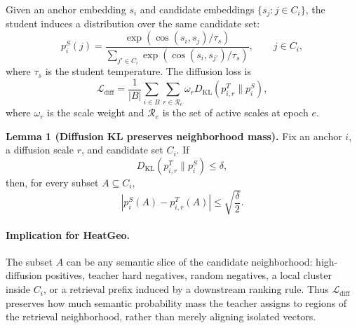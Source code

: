 Given an anchor embedding $s_i$ and candidate embeddings $\{s_j:j\in C_i\}$, the student induces a distribution over the same candidate set:
\begin{equation}
    p_i^{S}(j)
    =
    \frac{\exp(\cos(s_i,s_j)/\tau_s)}
    {\sum_{j'\in C_i}\exp(\cos(s_i,s_{j'})/\tau_s)},
    \qquad j\in C_i,
\end{equation}
where $\tau_s$ is the student temperature. The diffusion loss is
\begin{equation}
    \mathcal{L}_{\mathrm{diff}}
    =
    \frac{1}{|B|}
    \sum_{i\in B}
    \sum_{r\in\mathcal{R}_{e}}
    \omega_r
    D_{\mathrm{KL}}
    \left(
        p_{i,r}^{T} \| p_i^{S}
    \right),
\end{equation}
where $\omega_r$ is the scale weight and $\mathcal{R}_{e}$ is the set of active scales at epoch $e$.

\smallskip
\noindent\textbf{Lemma 1 (Diffusion KL preserves neighborhood mass).}
Fix an anchor $i$, a diffusion scale $r$, and candidate set $C_i$. If
\begin{equation}
    D_{\mathrm{KL}}\left(p^T_{i,r}\|p_i^S\right)\le \delta,
\end{equation}
then, for every subset $A\subseteq C_i$,
\begin{equation}
    \left|p_i^S(A)-p^T_{i,r}(A)\right|
    \le
    \sqrt{\frac{\delta}{2}}.
\end{equation}

\paragraph{Implication for HeatGeo.}
The subset $A$ can be any semantic slice of the candidate neighborhood: high-diffusion positives, teacher hard negatives, random negatives, a local cluster inside $C_i$, or a retrieval prefix induced by a downstream ranking rule. Thus $\mathcal{L}_{\mathrm{diff}}$ preserves how much semantic probability mass the teacher assigns to regions of the retrieval neighborhood, rather than merely aligning isolated vectors.

